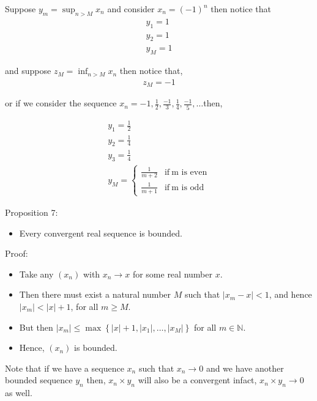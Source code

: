 \documentclass[12pt,a4paper]{article}
\begin{document}
Suppose \(y_{m}= \sup_{n>M} x_{n}\) and consider \(x_{n}={(-1)}^n\) then notice that
 \begin{align*}
    y_{1}=1\\
    y_{2}=1\\
    y_{M}=1
\end{align*}

and suppose \(z_{M}= \inf_{n>M} x_{n}\) then notice that,
 \begin{align*}
    z_{M}=-1
\end{align*}  

or if we consider the sequence \(x_{n}= -1, \frac{1}{2}, \frac{-1}{3}, \frac{1}{4}, \frac{-1}{5},\ldots \)then,

 \begin{align*}
    y_{1}=\frac{1}{2}\\
    y_{2}=\frac{1}{4}\\
    y_{3}=\frac{1}{4}\\
    y_{M}= \begin{cases} \frac{1}{m+2} & \text{if} \ \text{m is even}\\
        \frac{1}{m+1} & \text{if} \ \text{m is odd}
    \end{cases}
\end{align*}

Proposition 7:
\begin{itemize}
    \item  Every convergent real sequence is bounded.
\end{itemize}
Proof:
\begin{itemize}
    \item   Take any \(\left(x_n\right)\) with \(x_n \rightarrow x\) for some real number \(x\).
    \item Then there must exist a natural number \(M\) such that \(\left|x_m-x\right|<1\), and hence \(\left|x_m\right|<|x|+1\), for all \(m \geq M\).
    \item But then \(\left|x_m\right| \leq \max \left\{|x|+1,\left|x_1\right|, \ldots,\left|x_M\right|\right\}\) for all \(m \in \mathbb{N}\).
    \item Hence, \(\left(x_n\right)\) is bounded.
\end{itemize}

Note that if we have a sequence \(x_{n}\) such that \(x_{n} \to 0 \) and we have another bounded sequence \(y_{n}\) then, \(x_{n} \times y_{n} \) will also be a convergent infact, \(x_{n} \times y_{n} \to 0 \) as well.
\end{document}
